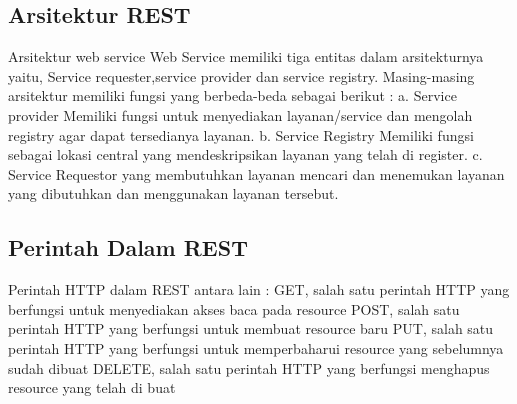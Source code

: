 \documentclass[12pt,a4paper]{article}
\begin{document}
\subsection{Arsitektur REST}
Arsitektur web service
Web Service memiliki tiga entitas dalam arsitekturnya yaitu, Service requester,service provider dan service registry. Masing-masing arsitektur memiliki fungsi yang berbeda-beda sebagai berikut :
a.	Service provider
Memiliki fungsi untuk menyediakan layanan/service dan mengolah registry agar dapat tersedianya layanan.
b.	Service Registry 
Memiliki fungsi sebagai lokasi central yang mendeskripsikan layanan yang telah di register.
c.	Service Requestor 
yang membutuhkan layanan mencari dan menemukan layanan yang dibutuhkan dan menggunakan layanan tersebut.

\subsection{Perintah Dalam REST}
Perintah HTTP dalam REST antara lain :
GET, salah satu perintah HTTP yang berfungsi untuk menyediakan akses baca pada resource
POST, salah satu perintah HTTP yang berfungsi untuk membuat resource baru
PUT, salah satu perintah HTTP yang berfungsi untuk memperbaharui resource yang sebelumnya sudah dibuat
DELETE, salah satu perintah HTTP yang berfungsi menghapus resource yang telah di buat
\end{document}
